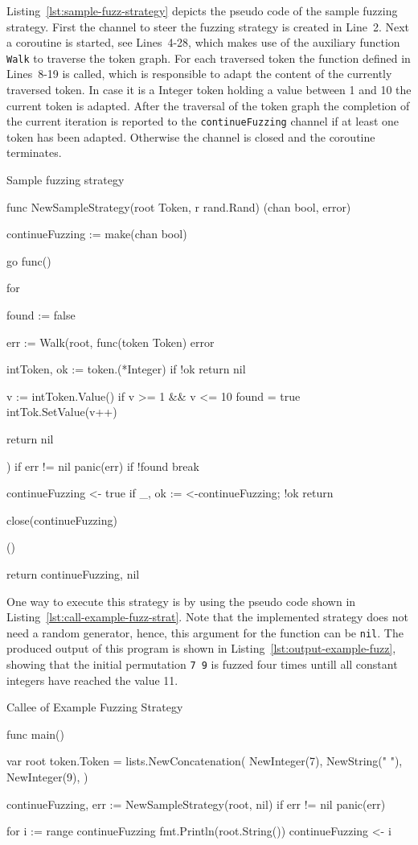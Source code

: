 Listing~\ref{lst:sample-fuzz-strategy} depicts the pseudo code of the sample fuzzing strategy. First the channel to steer the fuzzing strategy is created in Line~2. Next a coroutine is started, see Lines~4-28, which makes use of the auxiliary function \texttt{Walk} to traverse the token graph. For each traversed token the function defined in Lines~8-19 is called, which is responsible to adapt the content of the currently traversed token. In case it is a Integer token holding a value between 1 and 10 the current token is adapted. After the traversal of the token graph the completion of the current iteration is reported to the \texttt{continueFuzzing} channel if at least one token has been adapted. Otherwise the channel is closed and the coroutine terminates.

\begin{listing}[ht]
\caption{Sample fuzzing strategy}
\label{lst:sample-fuzz-strategy}
\begin{gocode}
func NewSampleStrategy(root Token, r rand.Rand) (chan bool, error){
	continueFuzzing := make(chan bool)

	go func() {
		for {
			found := false

			err := Walk(root, func(token Token) error {
				intToken, ok := token.(*Integer)
				if !ok { return nil }

				v := intToken.Value()
				if v >= 1 && v <= 10 {
					found = true
					intTok.SetValue(v++)
				}

				return nil
			})
			if err != nil { panic(err) }
			if !found { break }

			continueFuzzing <- true
			if _, ok := <-continueFuzzing; !ok { return }
		}

		close(continueFuzzing)
	}()

	return continueFuzzing, nil
}
\end{gocode}
\end{listing}


One way to execute this strategy is by using the pseudo code shown in Listing~\ref{lst:call-example-fuzz-strat}. Note that the implemented strategy does not need a random generator, hence, this argument for the function can be \texttt{nil}. The produced output of this program is shown in Listing~\ref{lst:output-example-fuzz}, showing that the initial permutation \texttt{7 9} is fuzzed four times untill all constant integers have reached the value 11.

\begin{listing}
\caption{Callee of Example Fuzzing Strategy}
\label{lst:call-example-fuzz-strat}
\begin{gocode}
func main() {
	var root token.Token = lists.NewConcatenation(
		NewInteger(7),
		NewString(" "),
		NewInteger(9),
	)

	continueFuzzing, err := NewSampleStrategy(root, nil)
	if err != nil { panic(err) }

	for i := range continueFuzzing {
		fmt.Println(root.String())
		continueFuzzing <- i
	}
}
\end{gocode}
\end{listing}

